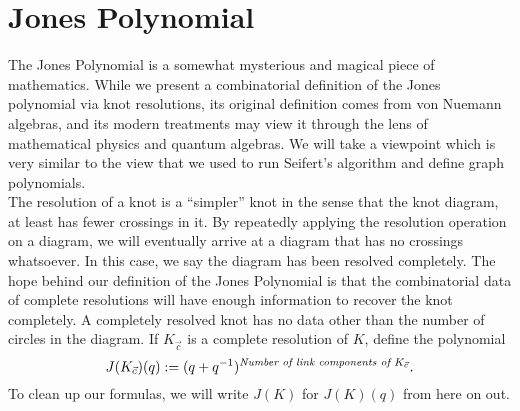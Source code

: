 \section{Jones Polynomial}
The Jones Polynomial is a somewhat mysterious and magical piece of mathematics. While we present a combinatorial definition of the Jones polynomial via knot resolutions, its original definition comes from von Nuemann algebras, and its modern treatments may view it through the lens of mathematical physics and quantum algebras. We will take a viewpoint which is very similar to the view that we used to run Seifert's algorithm and define graph polynomials. \\

The resolution of a knot is a ``simpler'' knot in the sense that the knot diagram, at least has fewer crossings in it. By repeatedly applying the resolution operation on a  diagram, we will eventually arrive at a diagram that has no crossings whatsoever. In this case, we say the diagram has been resolved completely. 
The hope behind our definition of the Jones Polynomial is that the combinatorial data of complete resolutions will have enough information to recover the knot completely. A completely resolved knot has no data other than the number of circles in the diagram. If $K_{\vec c}$ is a complete resolution of $K$, define the polynomial 
\[J(K_{\vec c})(q):= (q+q^{-1})^{\emph{Number of link components of $K_{\vec c}$}}.\]
To clean up our formulas, we will  write $J(K)$ for $J(K)(q)$ from here on out. \\

